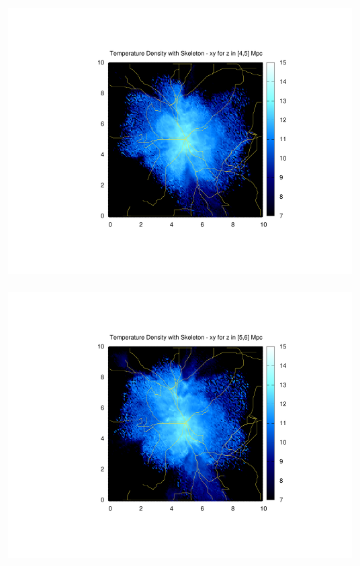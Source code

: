\documentclass[journal]{IEEEtran}
\begin{document}
\begin{figure}[!t]
\begin{subfigure}[t]{0.3\textwidth}
		\includegraphics[width=\linewidth]{TempDenSkel05}
	\end{subfigure}
	\quad
	\begin{subfigure}[t]{0.3\textwidth}
		\centering
		\includegraphics[width=\linewidth]{TempDenSkel06}
	\end{subfigure}
	\\
	\begin{subfigure}[t]{0.3\textwidth}
		\centering

\end{subfigure}
\end{figure}
\end{document}
